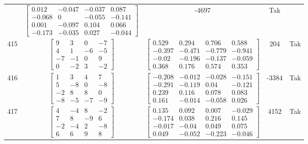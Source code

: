 \documentclass[a4paper,12pt]{article}
\begin{document}
\begin{tabular}{c c c c c}
&
$\begin{bmatrix} 0.012 & -0.047 & -0.037 & 0.087 \\ -0.068 & 0 & -0.055 & -0.141 \\ 0.001 & -0.097 & 0.104 & 0.066 \\ -0.173 & -0.035 & 0.027 & -0.044 \end{bmatrix}$
&
-4697
&
Tak
\\
415
&
$\begin{bmatrix} 9 & 3 & 0 & -7 \\ 4 & 1 & -6 & -5 \\ -7 & -1 & 0 & 9 \\ 0 & -2 & 3 & -2 \end{bmatrix}$
&
$\begin{bmatrix} 0.529 & 0.294 & 0.706 & 0.588 \\ -0.397 & -0.471 & -0.779 & -0.941 \\ -0.02 & -0.196 & -0.137 & -0.059 \\ 0.368 & 0.176 & 0.574 & 0.353 \end{bmatrix}$
&
204
&
Tak
\\
416
&
$\begin{bmatrix} 1 & 3 & 4 & 7 \\ 5 & -8 & 0 & -8 \\ -2 & 8 & 8 & 0 \\ -8 & -5 & -7 & -9 \end{bmatrix}$
&
$\begin{bmatrix} -0.208 & -0.012 & -0.028 & -0.151 \\ -0.291 & -0.119 & 0.04 & -0.121 \\ 0.239 & 0.116 & 0.078 & 0.083 \\ 0.161 & -0.014 & -0.058 & 0.026 \end{bmatrix}$
&
-3384
&
Tak
\\
417
&
$\begin{bmatrix} 4 & -4 & 8 & -2 \\ 7 & 8 & -9 & 6 \\ -2 & -4 & 2 & -8 \\ 6 & 6 & 9 & 8 \end{bmatrix}$
&
$\begin{bmatrix} 0.135 & 0.092 & 0.007 & -0.029 \\ -0.174 & 0.038 & 0.216 & 0.145 \\ -0.017 & -0.04 & 0.049 & 0.075 \\ 0.049 & -0.052 & -0.223 & -0.046 \end{bmatrix}$
&
4152
&
Tak
\\

\end{tabular}
\end{document}
